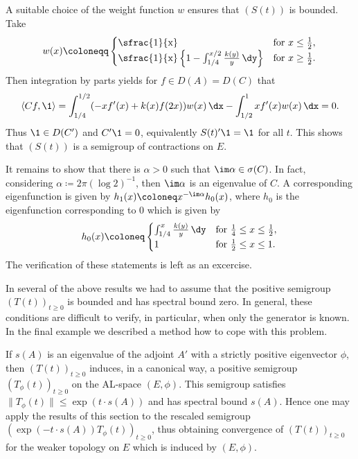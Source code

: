 \begin{example}
A suitable choice of the weight function $w$ ensures that $(S(t))$ is bounded.
Take
\begin{equation}\label{eq:c4-2.14}
w(x) \coloneqq \begin{cases}
    \text{\sfrac{1}{x}} & \text{for } x \leq \frac{1}{2}, \\
    \text{\sfrac{1}{x}} \left\{1 - \int_{1/4}^{x/2} \frac{k(y)}{y} \, \dy \right\} & \text{for } x \geq \frac{1}{2}.
\end{cases}
\end{equation}
Then integration by parts yields for $f \in D(A) = D(C)$ that
\begin{align*}
\langle Cf,\1 \rangle = \int_{1/4}^{1/2} (-xf'(x) + k(x)f(2x))w(x) \, \dx - \int_{1/2}^{1} xf'(x)w(x) \, \dx = 0.
\end{align*}
Thus $\1 \in D(C')$ and $C'\1 = 0$, equivalently $S(t)'\1 = \1$ for all $t$.
This shows that $(S(t))$ is a semigroup of contractions on $E$.

It remains to show that there is $\alpha > 0$ such that $\im\alpha \in \sigma(C)$.
In fact, considering $\alpha \coloneqq 2\pi(\log 2)^{-1}$,  then $\im\alpha$ is an eigenvalue of\/ $C$.
A corresponding eigenfunction is given by $h_{1}(x) \coloneq  x^{-\im\alpha}h_{0}(x)$, where $h_{0}$ is the eigenfunction corresponding to $0$ which is given by
\begin{equation}\label{eq:c4-2.15}
h_{0}(x) \coloneq  \begin{cases}
    \int_{1/4}^{x} \frac{k(y)}{y} \, \dy & \text{for } \frac{1}{4} \leq x \leq \frac{1}{2}, \\
    1 & \text{for } \frac{1}{2} \leq x \leq 1.
\end{cases}
\end{equation}
The verification of these statements is left as an excercise.
\end{example}
In several of the above results we had to assume that the positive semigroup $(T(t))_{t\geq 0}$ is bounded and has spectral bound zero.
In general, these conditions are difficult to verify, in particular, when only the generator is known.
In the final example we described a method how to cope with this problem. 

If\/ $s(A)$ is an eigenvalue of the adjoint $A'$ with a strictly positive eigenvector $\phi$, then $(T(t))_{t\geq 0}$ induces, in a canonical way, a positive semigroup $(T_{\phi}(t))_{t \geq 0}$ on the AL-space $(E,\phi)$.
This semigroup satisfies $\|T_{\phi}(t)\| \leq \exp(t \cdot s(A))$ and has spectral bound $s(A)$.
Hence one may apply the results of this section to the rescaled semigroup $(\exp(-t \cdot s(A))T_{\phi}(t))_{t \geq 0}$, thus obtaining convergence of\/ $(T(t))_{t \geq 0}$ for the weaker topology on $E$ which is induced by $(E,\phi)$.

